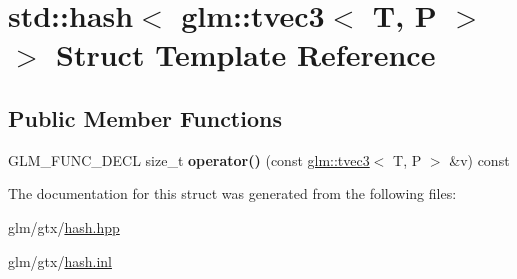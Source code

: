 \hypertarget{structstd_1_1hash_3_01glm_1_1tvec3_3_01T_00_01P_01_4_01_4}{\section{std\-:\-:hash$<$ glm\-:\-:tvec3$<$ T, P $>$ $>$ Struct Template Reference}
\label{structstd_1_1hash_3_01glm_1_1tvec3_3_01T_00_01P_01_4_01_4}
}
\subsection*{Public Member Functions}
\begin{DoxyCompactItemize}
\item 
\hypertarget{structstd_1_1hash_3_01glm_1_1tvec3_3_01T_00_01P_01_4_01_4_ac2ff643db98f9e99f5229cce5735b2e9}{G\-L\-M\-\_\-\-F\-U\-N\-C\-\_\-\-D\-E\-C\-L size\-\_\-t {\bfseries operator()} (const \hyperlink{structglm_1_1tvec3}{glm\-::tvec3}$<$ T, P $>$ \&v) const }\label{structstd_1_1hash_3_01glm_1_1tvec3_3_01T_00_01P_01_4_01_4_ac2ff643db98f9e99f5229cce5735b2e9}

\end{DoxyCompactItemize}


The documentation for this struct was generated from the following files\-:\begin{DoxyCompactItemize}
\item 
glm/gtx/\hyperlink{hash_8hpp}{hash.\-hpp}\item 
glm/gtx/\hyperlink{hash_8inl}{hash.\-inl}\end{DoxyCompactItemize}
